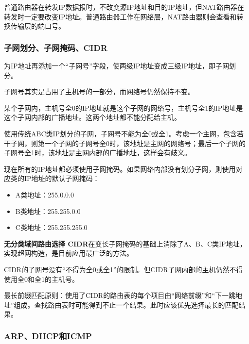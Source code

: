 \documentclass[12pt, a4paper, oneside]{ctexart}
\begin{document}
普通路由器在转发IP数据报时，不改变源IP地址和目的IP地址，但NAT路由器在转发时一定要改变IP地址。普通路由器工作在网络层，NAT路由器则会查看和转换传输层的端口号。

\subsubsection{子网划分、子网掩码、CIDR}

为IP地址再添加一个“子网号”字段，使两级IP地址变成三级IP地址，即子网划分。

子网号其实是占用了主机号的一部分，而网络号仍然保持不变。

某个子网内，主机号全0的IP地址就是这个子网的网络号，主机号全1的IP地址是这个子网内部的广播地址。这两个地址都不能分配给主机。

使用传统ABC类IP划分的子网，子网号不能为全0或全1。考虑一个主网，包含若干子网，则第一个子网的子网号全0时，该地址是主网的网络号；最后一个子网的子网号全1时，该地址是主网内部的广播地址，这样会有歧义。

现在所有的IP地址都必须使用子网掩码。如果网络内部没有划分子网，则使用对应类的IP地址的默认子网掩码：
\begin{itemize}
    \item A类地址：255.0.0.0
    \item B类地址：255.255.0.0
    \item C类地址：255.255.255.0
\end{itemize}

\textbf{无分类域间路由选择 CIDR}在变长子网掩码的基础上消除了A、B、C类IP地址，实现超网构造，是目前应用最广泛的方法。

CIDR的子网号没有“不得为全0或全1”的限制。但CIDR子网内部的主机仍然不得使用全0和全1的主机号。

最长前缀匹配原则：使用了CIDR的路由表的每个项目由“网络前缀”和“下一跳地址”组成。查找路由表时可能得到不止一个结果。此时应该优先选择最长的匹配结果。

\subsubsection{ARP、DHCP和ICMP}
\end{document}
